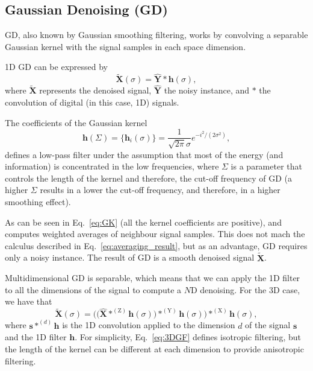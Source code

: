 \documentclass{article}
\begin{document}
\subsection{Gaussian Denoising (GD)}

GD, also known by Gaussian smoothing filtering, works by convolving a
separable Gaussian kernel with the signal samples in each space
dimension.

1D GD can be expressed by
\begin{equation}
  \tilde{\mathbf{X}}(\sigma) = \hat{\mathbf{Y}}*\mathbf{h}(\sigma),
  \label{eq:GF}
\end{equation}
where $\tilde{\mathbf{X}}$ represents the denoised signal,
$\hat{\mathbf{Y}}$ the noisy instance, and $*$ the convolution of
digital (in this case, 1D) signals.

The coefficients of the Gaussian kernel
\begin{equation}
  \mathbf{h}(\Sigma) = \{\mathbf{h}_i(\sigma)\} = \frac{1}{\sqrt{2\pi}\sigma}e^{{-i}^2/(2\sigma^2)},
  \label{eq:GK}
\end{equation}
defines a low-pass filter under the assumption that most of the energy
(and information) is concentrated in the low frequencies, where
$\Sigma$ is a parameter that controls the length of the kernel and
therefore, the cut-off frequency of GD (a higher $\Sigma$ results in a
lower the cut-off frequency, and therefore, in a higher smoothing
effect).

As can be seen in Eq.~\ref{eq:GK} (all the kernel coefficients are
positive), and computes weighted averages of neighbour signal
samples. This does not mach the calculus described in
Eq.~\ref{eq:averaging_result}, but as an advantage, GD requires only a
noisy instance. The result of GD is a smooth denoised signal
$\tilde{\mathbf X}$.

Multidimensional GD is separable, which means that we can apply the 1D
filter to all the dimensions of the signal to compute a $N$D
denoising. For the 3D case, we have that
\begin{equation}
  \tilde{\mathbf{X}}(\sigma) = \Big(\big(\hat{\mathbf X}*^{(\text{Z})}{\mathbf h}(\sigma)\big)*^{(\text{Y})}{\mathbf h}(\sigma)\Big)*^{(\text{X})}{\mathbf h}(\sigma),
    \label{eq:3DGF}
\end{equation}
where ${\mathbf s}*^{(d)}{\mathbf h}$ is the 1D convolution applied to
the dimension $d$ of the signal ${\mathbf s}$ and the 1D filter
${\mathbf h}$. For simplicity, Eq.~\ref{eq:3DGF} defines isotropic
filtering, but the length of the kernel can be different at each
dimension to provide anisotropic filtering.
\end{document}
